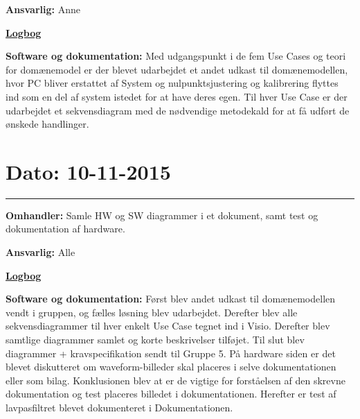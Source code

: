 \textbf{Ansvarlig:} Anne

\underline{\textbf{Logbog}}

\textbf{Software og dokumentation: }Med udgangspunkt i de fem Use Cases og teori for domænemodel er der blevet udarbejdet et andet udkast til domænemodellen, hvor PC bliver erstattet af System og nulpunktsjustering og kalibrering flyttes ind som en del af system istedet for at have deres egen.
Til hver Use Case er der udarbejdet et sekvensdiagram med de nødvendige metodekald for at få udført de ønskede handlinger.
\\

\section{Dato: 10-11-2015}
\hrule
\textbf{Omhandler:} Samle HW og SW diagrammer i et dokument, samt test og dokumentation af hardware.

\textbf{Ansvarlig:} Alle

\underline{\textbf{Logbog}}

\textbf{Software og dokumentation: }Først blev andet udkast til domænemodellen vendt i gruppen, og fælles løsning blev udarbejdet. Derefter blev alle sekvensdiagrammer til hver enkelt Use Case tegnet ind i Visio. Derefter blev samtlige diagrammer samlet og korte beskrivelser tilføjet. Til slut blev diagrammer + kravspecifikation sendt til Gruppe 5. 
På hardware siden er det blevet diskutteret om waveform-billeder skal placeres i selve dokumentationen eller som bilag. Konklusionen blev at er de vigtige for forståelsen af den skrevne dokumentation og test placeres billedet i dokumentationen. Herefter er test af lavpasfiltret blevet dokumenteret i Dokumentationen.
\\